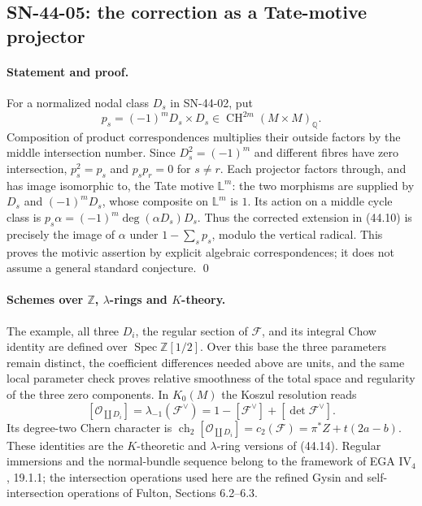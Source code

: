 \documentclass[11pt,a4paper]{article}
\theoremstyle{definition}
\theoremstyle{remark}
\begin{document}
\subsection{SN-44-05: the correction as a Tate-motive projector}
\label{sn:44-05}

\paragraph{Statement and proof.}
For a normalized nodal class $D_s$ in SN-44-02, put
\[
 p_s=(-1)^mD_s\times D_s\in\operatorname{CH}^{2m}(M\times M)_{\mathbb Q}.
\]
Composition of product correspondences multiplies their outside
factors by the middle intersection number.  Since
$D_s^2=(-1)^m$ and different fibres have zero intersection,
$p_s^2=p_s$ and $p_sp_r=0$ for $s\ne r$.
Each projector factors through, and has image isomorphic to,
the Tate motive $\mathbb L^m$: the two morphisms are supplied by
$D_s$ and $(-1)^mD_s$, whose composite on $\mathbb L^m$ is $1$.
Its action on a middle cycle class is
$p_s\alpha=(-1)^m\deg(\alpha D_s)D_s$.  Thus the corrected
extension in (44.10) is precisely the image of $\alpha$ under
$1-\sum_sp_s$, modulo the vertical radical.  This proves the
motivic assertion by explicit algebraic correspondences; it does
not assume a general standard conjecture. \qed

\paragraph{Schemes over $\mathbb Z$, $\lambda$-rings and $K$-theory.}
The example, all three $D_i$, the regular section of $\mathcal F$,
and its integral Chow identity are defined over
$\operatorname{Spec}\mathbb Z[1/2]$.  Over this base the three
parameters remain distinct, the coefficient differences needed
above are units, and the same local parameter check proves
relative smoothness of the total space and regularity of the
three zero components.  In $K_0(M)$ the Koszul resolution reads
\[
 [\mathcal O_{\coprod D_i}]
     =\lambda_{-1}(\mathcal F^\vee)
     =1-[\mathcal F^\vee]+[\det\mathcal F^\vee].
\]
Its degree-two Chern character is
$\operatorname{ch}_2[\mathcal O_{\coprod D_i}]
 =c_2(\mathcal F)=\pi^*Z+t(2a-b)$.
These identities are the $K$-theoretic and $\lambda$-ring versions
of (44.14).  Regular immersions and the normal-bundle sequence
belong to the framework of EGA IV$_4$, 19.1.1;
the intersection operations used here are the refined Gysin and
self-intersection operations of Fulton, Sections 6.2--6.3.
\end{document}
